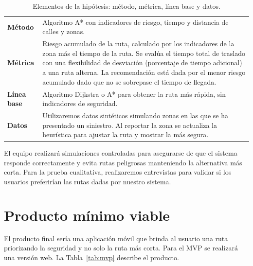 \documentclass[11pt]{article}
\begin{document}
\begin{table}[H]
  \caption{Elementos de la hipótesis: método, métrica, línea base y datos.}
  \label{tab:hipotesis}
  \renewcommand{\arraystretch}{1.3}
  \begin{tabularx}{\textwidth}{@{}>{\bfseries}p{}X@{}}
    \toprule
    Método & Algoritmo A* con indicadores de riesgo, tiempo y distancia de calles y zonas. \\
    Métrica & Riesgo acumulado de la ruta, calculado por los indicadores de la zona más el tiempo
              de la ruta. Se evalúa el tiempo total de traslado con una flexibilidad de desviación
              (porcentaje de tiempo adicional) a una ruta alterna. La recomendación está dada por el
              menor riesgo acumulado dado que no se sobrepase el tiempo de llegada. \\
    Línea base & Algoritmo Dijkstra o A* para obtener la ruta más rápida, sin indicadores de
                 seguridad. \\
    Datos & Utilizaremos datos sintéticos simulando zonas en las que se ha presentado un siniestro.
            Al reportar la zona se actualiza la heurística para ajustar la ruta y mostrar la más
            segura. \\
    \bottomrule
  \end{tabularx}
\end{table}

El equipo realizará simulaciones controladas para asegurarse de que el sistema responde
correctamente y evita rutas peligrosas manteniendo la alternativa más corta. Para la prueba
cualitativa, realizaremos entrevistas para validar si los usuarios preferirían las rutas dadas por
nuestro sistema.

\section{Producto mínimo viable}
\label{sec:mvp}

El producto final sería una aplicación móvil que brinda al usuario una ruta priorizando la
seguridad y no solo la ruta más corta. Para el MVP se realizará una versión web. La
Tabla~\ref{tab:mvp} describe el producto.
\end{document}
